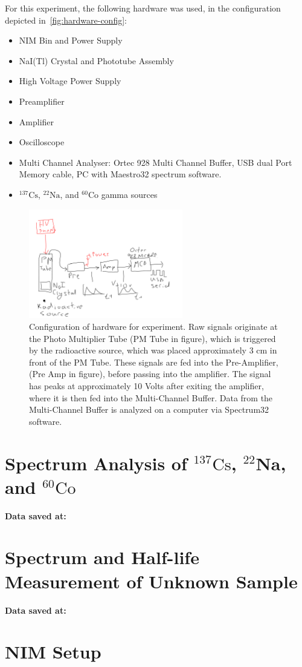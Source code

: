 \documentclass[a4paper]{article}
\begin{document}
For this experiment, the following hardware was used, in the configuration depicted in~\autoref{fig:hardware-config}:
\begin{itemize}
    \item NIM Bin and Power Supply
    \item NaI(Tl) Crystal and Phototube Assembly
    \item High Voltage Power Supply
    \item Preamplifier
    \item Amplifier
    \item Oscilloscope
    \item Multi Channel Analyser: Ortec 928 Multi Channel Buffer, USB dual Port Memory cable, PC with Maestro32 spectrum software.
    \item $^{137}\mathrm{Cs}$, $^{22}\mathrm{Na}$, and $^{60}\mathrm{Co}$ gamma sources
    \end{itemize}
\begin{figure}[H]
    \centering
    \includegraphics[width=0.6\textwidth]{figures/experiment-setup.pdf}
    \caption{Configuration of hardware for experiment. Raw signals originate at the Photo Multiplier Tube (PM Tube in figure), which is triggered by the radioactive source, which was placed approximately 3 cm in front of the PM Tube. These signals are fed into the Pre-Amplifier, (Pre Amp in figure), before passing into the amplifier. The signal has peaks at approximately 10 Volts after exiting the amplifier, where it is then fed into the Multi-Channel Buffer. Data from the Multi-Channel Buffer is analyzed on a computer via Spectrum32 software.}
    \label{fig:hardware-config}
\end{figure}

\section{Spectrum Analysis of $^{137}\mathrm{Cs}$, $^{22}\mathbf{Na}$, and $^{60}\mathrm{Co}$}

\textbf{Data saved at: }

\section{Spectrum and Half-life Measurement of Unknown Sample}

\textbf{Data saved at: }

\appendix
\section{NIM Setup}
\end{document}
